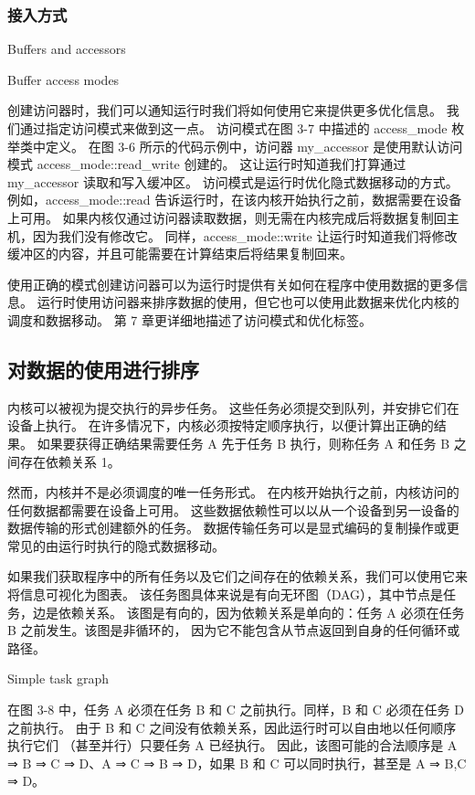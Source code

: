\subsubsection{接入方式}
{\color{red} Buffers and accessors }

{\color{red} Buffer access modes}

创建访问器时，我们可以通知运行时我们将如何使用它来提供更多优化信息。 我们通过指定访问模式来做到这一点。 
访问模式在图 3-7 中描述的 access\_mode 枚举类中定义。 
在图 3-6 所示的代码示例中，访问器 my\_accessor 是使用默认访问模式 access\_mode::read\_write 创建的。 
这让运行时知道我们打算通过 my\_accessor 读取和写入缓冲区。 访问模式是运行时优化隐式数据移动的方式。 
例如，access\_mode::read 告诉运行时，在该内核开始执行之前，数据需要在设备上可用。 
如果内核仅通过访问器读取数据，则无需在内核完成后将数据复制回主机，因为我们没有修改它。 
同样，access\_mode::write 让运行时知道我们将修改缓冲区的内容，并且可能需要在计算结束后将结果复制回来。

使用正确的模式创建访问器可以为运行时提供有关如何在程序中使用数据的更多信息。 
运行时使用访问器来排序数据的使用，但它也可以使用此数据来优化内核的调度和数据移动。 
第 7 章更详细地描述了访问模式和优化标签。

\subsection{对数据的使用进行排序}
内核可以被视为提交执行的异步任务。 这些任务必须提交到队列，并安排它们在设备上执行。 
在许多情况下，内核必须按特定顺序执行，以便计算出正确的结果。 
如果要获得正确结果需要任务 A 先于任务 B 执行，则称任务 A 和任务 B 之间存在依赖关系 1。

然而，内核并不是必须调度的唯一任务形式。 在内核开始执行之前，内核访问的任何数据都需要在设备上可用。 
这些数据依赖性可以以从一个设备到另一设备的数据传输的形式创建额外的任务。 
数据传输任务可以是显式编码的复制操作或更常见的由运行时执行的隐式数据移动。

如果我们获取程序中的所有任务以及它们之间存在的依赖关系，我们可以使用它来将信息可视化为图表。 
该任务图具体来说是有向无环图（DAG），其中节点是任务，边是依赖关系。 
该图是有向的，因为依赖关系是单向的：任务 A 必须在任务 B 之前发生。该图是非循环的，
因为它不能包含从节点返回到自身的任何循环或路径。

{\color{red} Simple task graph }

在图 3-8 中，任务 A 必须在任务 B 和 C 之前执行。同样，B 和 C 必须在任务 D 之前执行。
由于 B 和 C 之间没有依赖关系，因此运行时可以自由地以任何顺序执行它们 （甚至并行）只要任务 A 已经执行。 
因此，该图可能的合法顺序是 A ⇒ B ⇒ C ⇒ D、A ⇒ C ⇒ B ⇒ D，如果 B 和 C 可以同时执行，甚至是 A ⇒ {B,C} ⇒ D。

